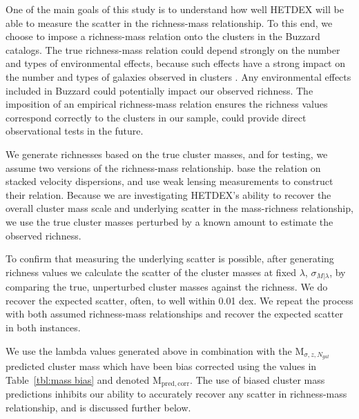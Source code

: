 One of the main goals of this study is to understand how well HETDEX will be able to measure the scatter in the richness-mass relationship. To this end, we choose to impose a richness-mass relation onto the clusters in the Buzzard catalogs. The true richness-mass relation could depend strongly on the number and types of environmental effects, because such effects have a strong impact on the number and types of galaxies observed in clusters . Any environmental effects included in Buzzard could potentially impact our observed richness. The imposition of an empirical richness-mass relation ensures the richness values correspond correctly to the clusters in our sample, could provide direct observational tests in the future.

We generate richnesses based on the true cluster masses, and for testing, we assume two versions of the richness-mass relationship. \cite{Farahi2016} base the relation on stacked velocity dispersions, and \cite{Simet2016} use weak lensing measurements to construct their relation. Because we are investigating HETDEX's ability to recover the overall cluster mass scale and underlying scatter in the mass-richness relationship, we use the true cluster masses perturbed by a known amount to estimate the observed richness. 

To confirm that measuring the underlying scatter is possible, after generating richness values we calculate the scatter of the cluster masses at fixed $\lambda$, $\sigma_{M|\lambda}$, by comparing the true, unperturbed cluster masses against the richness. We do recover the expected scatter, often, to well within 0.01 dex. We repeat the process with both assumed richness-mass relationships and recover the expected scatter in both instances. 

We use the lambda values generated above in combination with the $\mathrm{M}_{\sigma,z,N_{gal}}$ predicted cluster mass which have been bias corrected using the values in Table~\ref{tbl:mass bias} and denoted $\mathrm{M_{pred,corr}}$. The use of biased cluster mass predictions inhibits our ability to accurately recover any scatter in richness-mass relationship, and is discussed further below. 

